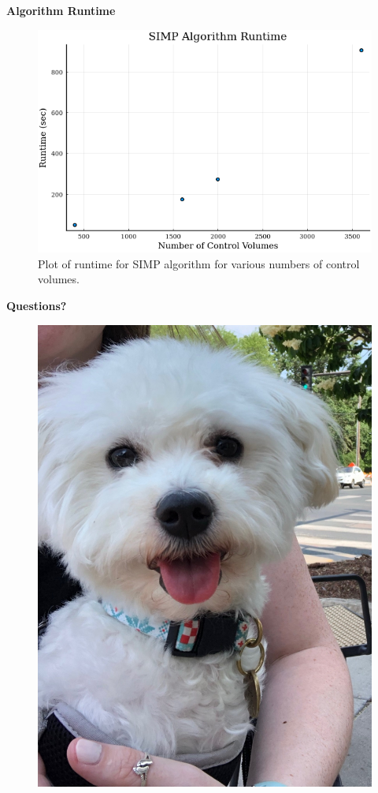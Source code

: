 \documentclass[final]{beamer}
\begin{document}
\begin{frame}{\textbf{Algorithm Runtime}}
	\begin{figure}
		\centering
		\includegraphics[width=0.8\linewidth]{SIMP-Runtime.png}
		\caption[SIMP Runtime Plot]{Plot of runtime for SIMP algorithm for various numbers of control volumes.}
		\label{fig:runtime}
	\end{figure}
\end{frame}


\begin{frame}{\textbf{Questions?}}
	\begin{figure}
		\centering
		\includegraphics[height=0.8\textheight]{elske.jpg}
	\end{figure}
\end{frame}
\end{document}
